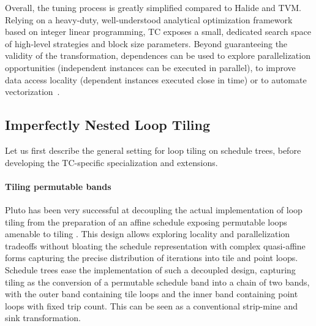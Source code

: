 Overall, the tuning process is greatly simplified compared to Halide and
TVM. Relying on a heavy-duty,
well-understood analytical optimization framework based on integer linear
programming, TC exposes a small, dedicated
search space of high-level strategies and block size parameters.
Beyond guaranteeing the validity of the transformation,
dependences can be used to explore parallelization opportunities
(independent instances can be executed in parallel),
to improve data access locality (dependent instances
executed close in time) or to automate
vectorization~\cite{Verdoolaege2017scheduler,Bondhugula2008Pluto,Zinenko2018Spatial,Vasilache2012joint,Pou11}.

\subsection{Imperfectly Nested Loop Tiling}
Let us first describe the general setting for loop tiling on schedule trees,
before developing the TC-specific specialization and extensions.

\paragraph{Tiling permutable bands}
Pluto has been very successful at decoupling the actual implementation
of loop tiling from the preparation of an affine schedule exposing
permutable loops amenable to tiling \cite{Bondhugula2008Pluto}. This
design allows exploring locality and parallelization tradeoffs
without bloating the schedule representation with complex quasi-affine
forms capturing the precise distribution of iterations into tile and
point loops. Schedule trees ease the implementation of such a
decoupled design, capturing tiling as the conversion of a permutable
schedule band into a chain of two bands, with the outer band
containing tile loops and the inner band containing point loops with
fixed trip count. This can be seen as a conventional strip-mine and
sink transformation.


